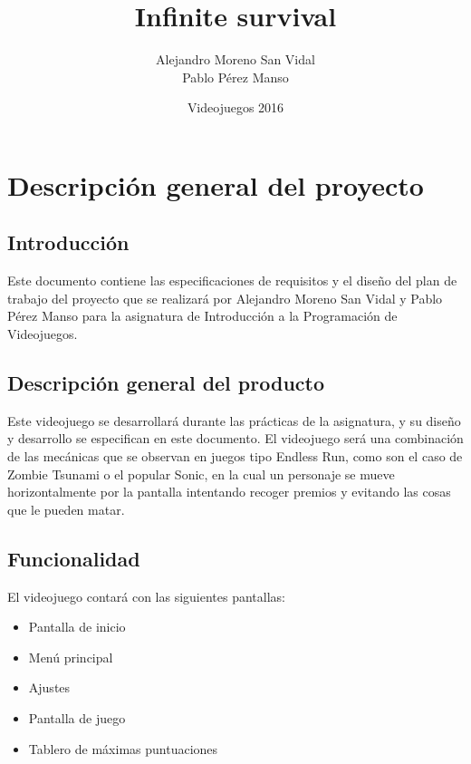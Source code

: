 \documentclass[palatino]{apuntes}
\title{Infinite survival}
\author{Alejandro Moreno San Vidal \\ Pablo Pérez Manso}
\date{Videojuegos 2016}
\begin{document}
\pagestyle{plain}
\maketitle
\tableofcontents
\newpage

\chapter{Descripción general del proyecto}

\section{Introducción}
Este documento contiene las especificaciones de requisitos y el diseño del plan de trabajo del proyecto que se realizará por Alejandro Moreno San Vidal y Pablo Pérez Manso para la asignatura de Introducción a la Programación de Videojuegos.

\section{Descripción general del producto}
Este videojuego se desarrollará durante las prácticas de la asignatura, y su diseño y desarrollo se especifican en este documento. El videojuego será una combinación de las mecánicas que se observan en juegos tipo Endless Run, como son el caso de Zombie Tsunami o el popular Sonic, en la cual un personaje se mueve horizontalmente por la pantalla intentando recoger premios y evitando las cosas que le pueden matar.

\section{Funcionalidad}

El videojuego contará con las siguientes pantallas:
\begin{itemize}
    \item Pantalla de inicio
    \item Menú principal
    \item Ajustes
    \item Pantalla de juego
    \item Tablero de máximas puntuaciones
\end{itemize}
\end{document}
